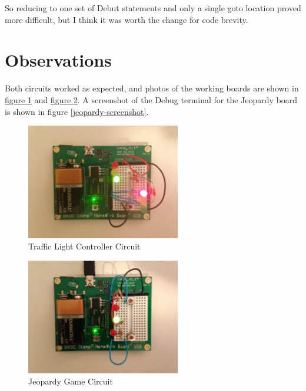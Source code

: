 \documentclass[11pt]{article}
\begin{document}
So reducing to one set of Debut statements and only a single goto location proved more difficult,
but I think it was worth the change for code brevity.

\section{Observations}

Both circuits worked as expected, and photos of the working boards are shown in
\hyperref[traffic-light]{figure \ref{traffic-light}}
and \hyperref[jeopardy-board]{figure \ref{jeopardy-board}}.
A screenshot of the Debug terminal for the Jeopardy board is shown in figure \ref{jeopardy-screenshot}.

\begin{figure}
\centering
\includegraphics[width=0.6\textwidth]{traffic-light.jpg}
\caption{Traffic Light Controller Circuit}
\label{traffic-light}
\end{figure}

\begin{figure}
\centering
\includegraphics[width=0.6\textwidth]{jeopardy-board.jpg}
\caption{Jeopardy Game Circuit}
\label{jeopardy-board}
\end{figure}
\end{document}
